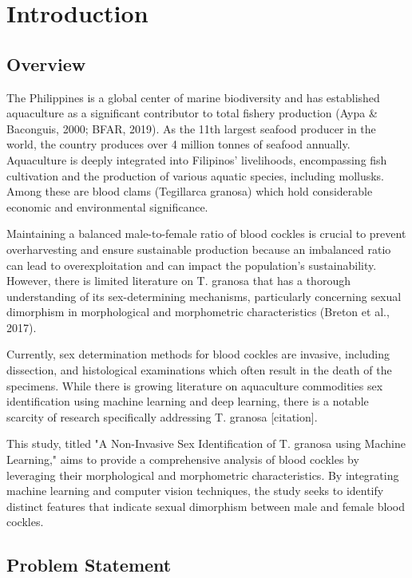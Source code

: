 \chapter{Introduction}
\label{sec:researchdesc}    %

\section{Overview}
\label{sec:overview}

The Philippines is a global center of marine biodiversity and has established aquaculture as a significant contributor to total fishery production (Aypa & Baconguis, 2000; BFAR, 2019). As the 11th largest seafood producer in the world, the country produces over 4 million tonnes of seafood annually. Aquaculture is deeply integrated into Filipinos' livelihoods, encompassing fish cultivation and the production of various aquatic species, including mollusks. Among these are blood clams (Tegillarca granosa) which hold considerable economic and environmental significance.

Maintaining a balanced male-to-female ratio of blood cockles is crucial to prevent overharvesting and ensure sustainable production because an imbalanced ratio can lead to overexploitation and can impact the population's sustainability. However, there is limited literature on T. granosa that has a thorough understanding of its sex-determining mechanisms, particularly concerning sexual dimorphism in morphological and morphometric characteristics (Breton et al., 2017).

Currently, sex determination methods for blood cockles are invasive, including dissection, and histological examinations which often result in the death of the specimens. While there is growing literature on aquaculture commodities sex identification using machine learning and deep learning, there is a notable scarcity of research specifically addressing T. granosa [citation].

This study, titled "A Non-Invasive Sex Identification of T. granosa using Machine Learning," aims to provide a comprehensive analysis of blood cockles by leveraging their morphological and morphometric characteristics. By integrating machine learning and computer vision techniques, the study seeks to identify distinct features that indicate sexual dimorphism between male and female blood cockles.

\section{Problem Statement}


